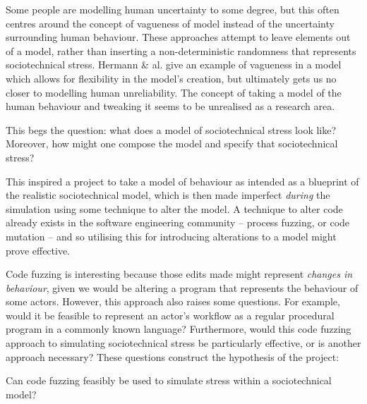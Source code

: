 Some people are modelling human uncertainty to some degree, but this often centres around the concept of vagueness of model instead of the uncertainty surrounding human behaviour. These approaches attempt to leave elements out of a model, rather than inserting a non-deterministic randomness that represents sociotechnical stress. Hermann \& al.\cite{Herrmann1999} give an example of vagueness in a model which allows for flexibility in the model's creation, but ultimately gets us no closer to modelling human unreliability. The concept of taking a model of the human behaviour and tweaking it seems to be unrealised as a research area. \par%

This begs the question: what does a model of sociotechnical stress look like? Moreover, how might one compose the model and specify that sociotechnical stress? \par%

This inspired a project to take a model of behaviour as intended as a blueprint of the realistic sociotechnical model, which is then made imperfect \emph{during} the simulation using some technique to alter the model. A technique to alter code already exists in the software engineering community -- process fuzzing, or code mutation\cite{Miller1988} -- and so utilising this for introducing alterations to a model might prove effective. \par%

Code fuzzing is interesting because those edits made might represent \emph{changes in behaviour}, given we would be altering a program that represents the behaviour of some actors. However, this approach also raises some questions. For example, would it be feasible to represent an actor's workflow as a regular procedural program in a commonly known language? Furthermore, would this code fuzzing approach to simulating sociotechnical stress be particularly effective, or is another approach necessary? These questions construct the hypothesis of the project: 
\begin{displayquote}
Can code fuzzing feasibly be used to simulate stress within a sociotechnical model?
\end{displayquote}%


